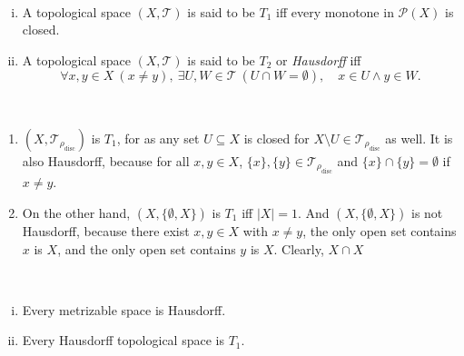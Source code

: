 \begin{definition} \
	\begin{enumerate}[(i)]
		\item A topological space $(X, \mathcal T)$ is said to be $T_1$ iff every monotone in $\mathcal P(X)$ is closed.
		\item A topological space $(X, \mathcal T)$ is said to be $T_2$ or \textit{Hausdorff} iff
			$$
			\forall x, y \in X \ (x \ne y), \ \exists U, W \in \mathcal T \ (U \cap W = \emptyset), \quad x \in U \land y \in W.
			$$
	\end{enumerate}
\end{definition}


\begin{note} \ 
	\begin{enumerate}
		\item $(X, \mathcal T_{\rho_\text{disc}})$ is $T_1$, for as any set $U \subseteq X$ is closed for $X \setminus U \in \mathcal T_{\rho_\text{disc}}$ as well. It is also Hausdorff, because for all $x,y \in X$, $\{x\}, \{y\} \in \mathcal T_{\rho_\text{disc}}$ and $\{x\} \cap \{y\} = \emptyset$ if $x \ne y$.
		\item On the other hand, $(X, \{\emptyset, X\})$ is $T_1$ iff $|X| = 1$. And $(X, \{\emptyset, X\})$ is not Hausdorff, because there exist $x,y \in X$ with $x \ne y$, the only open set contains $x$ is $X$, and the only open set contains $y$ is $X$. Clearly, $X \cap X$
	\end{enumerate}
\end{note}


\begin{lemma} \
	\begin{enumerate}[(i)]
		\item Every metrizable space is Hausdorff.
		\item Every Hausdorff topological space is $T_1$.
	\end{enumerate}
\end{lemma}


